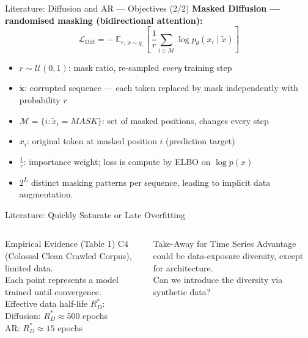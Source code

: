 \documentclass[aspectratio=169,10pt]{beamer}
\begin{document}
\begin{frame}{Literature: Diffusion and AR — Objectives (2/2)}
  \textbf{Masked Diffusion — randomised masking (bidirectional attention):}
  \[
    \mathcal{L}_{\mathrm{Diff}}
      = -\;\mathbb{E}_{r,\,\tilde{x}\sim q_{r}}\!
        \left[\,\frac{1}{r}
          \sum_{i\in\mathcal{M}}
            \log p_\theta\!\left(x_i \mid \tilde{x}\right)
        \right]
  \]

  \begin{itemize}
    \item $r\sim\mathcal{U}(0,1)$: mask ratio, re-sampled \emph{every} training step
    \item $\mathbf{\tilde{x}}$: corrupted sequence — each token replaced by
          mask independently with probability $r$
    \item $\mathcal{M}=\{i:\tilde{x}_i=MASK\}$:
          set of masked positions, changes every step
    \item $x_i$: original token at masked position $i$ (prediction target)
    \item $\tfrac{1}{r}$: importance weight; loss is compute by ELBO on
          $\log p(x)$
    \item $2^{L}$ distinct masking patterns per sequence, leading to implicit data augmentation.
  \end{itemize}
\end{frame}

\begin{frame}{Literature: Quickly Saturate or Late Overfitting}
\begin{columns}[T]
      \begin{block}{Empirical Evidence (Table 1)}
        \small
        C4 (Colossal Clean Crawled Corpus), limited data.\\[0.2em]
        Each point represents a model trained until convergence.\\[0.2em]
        Effective data half-life $R^{*}_{D}$:\\[0.2em]
        \quad Diffusion:\; $R^{*}_{D}\approx 500$ epochs\\
        \quad AR:\hspace{2.6em} $R^{*}_{D}\approx 15$\phantom{0} epochs
      \end{block}

      \begin{alertblock}{Take-Away for Time Series}
        \small
        Advantage could be data-exposure diversity,
        except for architecture.\\[0.2em]
        Can we introduce the diversity via synthetic data?
      \end{alertblock}
  \end{columns}
\end{frame}
\end{document}

